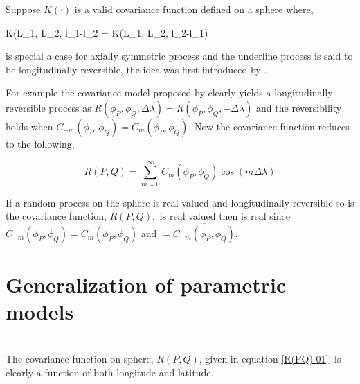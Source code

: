 						
			Suppose $K(\cdot)$ is a valid covariance function defined on a sphere where,
			
			\beq
			K(L_1, L_2, l_1-l_2 = K(L_1, L_2, l_2-l_1)
			\eeq
			
			is special a case for axially symmetric process and the underline process is said to be longitudinally reversible, the idea was first introduced by \cite{Stein2007}.  
			
			For example the covariance model proposed by \cite{Huang2012} clearly yields a longitudinally reversible process as $R(\phi_P, \phi_Q, \Delta\lambda) = R(\phi_P, \phi_Q, -\Delta\lambda)$ and the reversibility holds when $C_{-m}(\phi_P,\phi_Q)=C_m(\phi_P,\phi_Q)$. Now the covariance function reduces to the following,  
			
			\[
				R(P,Q) = \sum_{m=0}^{\infty} C_m(\phi_P,\phi_Q)\cos(m\Delta\lambda)
			\]
			
			If a random process on the sphere is real valued and longitudinally reversible so is the covariance function, $R(P,Q),$ is real valued then \Cm is real since $C_{-m}(\phi_P,\phi_Q)=C_m(\phi_P,\phi_Q)$  and \Cm $= \overline{C_{-m}(\phi_P,\phi_Q)}$.
			
				
			\section{Generalization of parametric models}
					
			 \\
					
			The covariance function on sphere, $R(P,Q)$,  given in equation \ref{R(PQ)-01}, is clearly a function of both longitude and latitude. 
				
